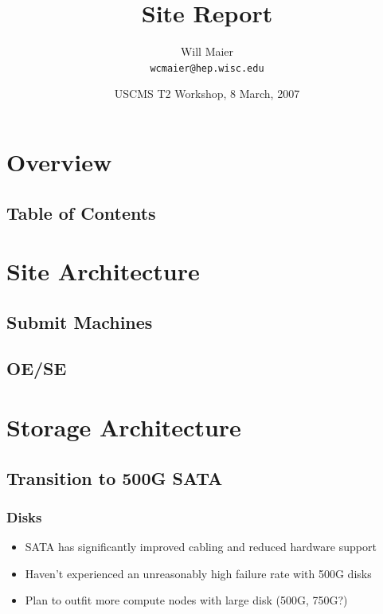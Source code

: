 \documentclass{beamer}
\title{Site Report}
\author[Will Maier]{Will Maier \\ \texttt{wcmaier@hep.wisc.edu}}
\institute[Wisconsin]{University of Wisconsin - High Energy Physics}
\date[8 March, 2007]{USCMS T2 Workshop, 8 March, 2007}
\begin{document}

\begin{frame}
    \titlepage
\end{frame}

\section{Overview}
\subsection{Table of Contents}
\begin{frame}
    \tableofcontents
\end{frame}

\section{Site Architecture}
\subsection{Submit Machines}
\subsection{OE/SE}

\section{Storage Architecture}
\subsection{Transition to 500G SATA}
\begin{frame}
\frametitle{Disks}
\begin{itemize}
    \item SATA has significantly improved cabling and reduced hardware support
    \item Haven't experienced an unreasonably high failure rate with 500G disks
    \item Plan to outfit more compute nodes with large disk (500G, 750G?)
\end{itemize}
\end{frame}
\end{document}
